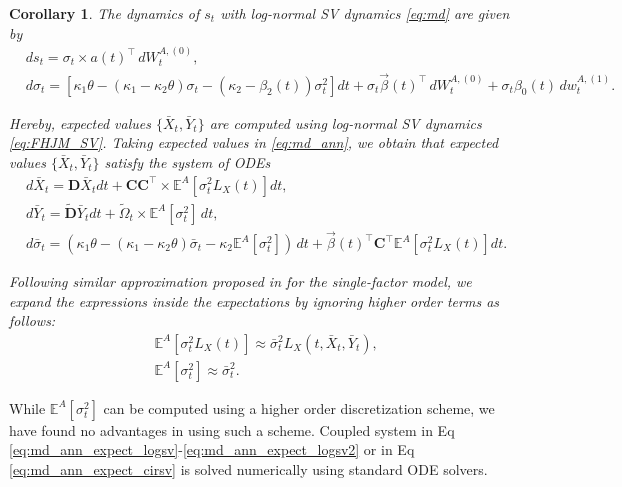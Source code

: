 \documentclass[pdftex,11pt,a4paper] {article}
\newtheorem{corollary}{Corollary}[section]
\begin{document}
\begin{corollary} The dynamics of $s_t$ with log-normal SV dynamics \eqref{eq:md} are given by
\begin{equation}\label{eq:swap_ann2_logsv}
\begin{split}
&ds_t=\sigma_t\times a(t)^\top\, dW^{A,(0)}_t,\\
&d\sigma_t=\left[\kappa_{1}\theta-(\kappa_1-\kappa_{2}\theta)\sigma_t-(\kappa_2-\beta_2(t))\sigma_t^2\right]dt +\sigma_t\vec{\beta}(t)^\top\,dW^{A,(0)}_t+\sigma_t\beta_0(t)\,dw^{A,(1)}_t.
\end{split}
\end{equation}

Hereby, expected values $\{\bar X_t,\bar Y_t\}$ are computed using log-normal SV dynamics \eqref{eq:FHJM_SV}. Taking expected values in \eqref{eq:md_ann}, we obtain that expected values $\{\bar X_t,\bar Y_t\}$ satisfy the system of ODEs
\begin{equation}\label{eq:md_ann_expect_logsv}
\begin{split}
&   d\bar X_{t} = \mathbf{D} \bar X_{t}dt  +  \mathbf{C}\mathbf{C}^\top \times \mathbb{E}^A\left[\sigma_t^2L_X(t)\right]dt,\\
& d\bar Y_{t} = \tilde{\mathbf{D}}\bar Y_{t}dt + \tilde\Omega_t\times \mathbb{E}^A\left[\sigma_t^2\right]\,dt,\\
&d\bar \sigma_t=\left(\kappa_{1}\theta-(\kappa_1-\kappa_{2}\theta)\bar \sigma_t-
\kappa_2\mathbb{E}^A[\sigma_t^2]\right)\,dt+\vec{\beta}(t)^\top \mathbf{C}^\top \mathbb{E}^A\left[\sigma_t^2L_X(t)\right]dt.
\end{split}
\end{equation}

Following similar approximation proposed in \cite{SeppRakhmonov2023a} for the single-factor model, we expand the expressions inside the expectations by ignoring higher order terms as follows:
\begin{equation}\label{eq:md_ann_expect_logsv2}
\begin{split}
&\mathbb{E}^A\left[\sigma_t^2L_X(t)\right]\approx \bar \sigma_t^2L_X(t,\bar X_t, \bar Y_t),\\
&\mathbb{E}^A\left[\sigma_t^2\right]\approx \bar \sigma_t^2.
\end{split}
\end{equation}
\end{corollary}

While $\mathbb{E}^A\left[\sigma_t^2\right]$ can be computed using a higher order discretization scheme, we have found no advantages in using such a scheme. Coupled system in Eq \eqref{eq:md_ann_expect_logsv}-\eqref{eq:md_ann_expect_logsv2} or in Eq \eqref{eq:md_ann_expect_cirsv} is solved numerically using standard ODE solvers.
\end{document}
